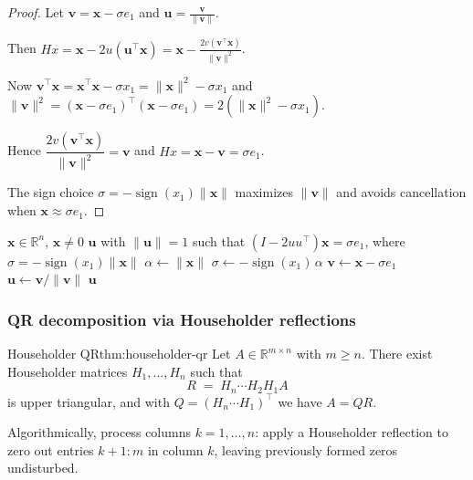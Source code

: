 \documentclass[../../main.tex]{subfiles}
\begin{document}
\begin{proof}
    Let $\mathbf{v}=\mathbf{x}-\sigma e_1$ and $\mathbf{u}=\frac{\mathbf{v}}{\|\mathbf{v}\|}$.

    Then $Hx=\mathbf{x}-2u(\mathbf{u}^\top \mathbf{x}) = \mathbf{x} - \frac{2v(\mathbf{v}^\top \mathbf{x})}{\|\mathbf{v}\|^2}$.

    Now $\mathbf{v}^\top \mathbf{x} = \mathbf{x}^\top \mathbf{x} - \sigma x_1 = \|\mathbf{x}\|^2 - \sigma x_1$ and $\|\mathbf{v}\|^2 = (\mathbf{x}-\sigma e_1)^\top(\mathbf{x}-\sigma e_1)=2(\|\mathbf{x}\|^2-\sigma x_1)$.

    Hence $\dfrac{2v(\mathbf{v}^\top \mathbf{x})}{\|\mathbf{v}\|^2}=\mathbf{v}$ and $Hx=\mathbf{x}-\mathbf{v}=\sigma e_1$.

    The sign choice $\sigma=-\operatorname{sign}(x_1)\|\mathbf{x}\|$ maximizes $\|\mathbf{v}\|$ and avoids cancellation when $\mathbf{x}\approx \sigma e_1$.
\end{proof}


\begin{algorithm}[H]
    \caption{Householder vector (stable sign)}
    \begin{algorithmic}[1]
        \Require $\mathbf{x}\in\mathbb{R}^n$, $\mathbf{x}\neq 0$
        \Ensure $\mathbf{u}$ with $\|\mathbf{u}\|=1$ such that $(I-2uu^\top)\mathbf{x}=\sigma e_1$, where $\sigma=-\operatorname{sign}(x_1)\|\mathbf{x}\|$
        \State $\alpha \gets \|\mathbf{x}\|$
        \State $\sigma \gets -\operatorname{sign}(x_1)\,\alpha$ 
        \State $\mathbf{v} \gets \mathbf{x}-\sigma e_1$
        \State $\mathbf{u} \gets \mathbf{v}/\|\mathbf{v}\|$
        \State \Return $\mathbf{u}$
    \end{algorithmic}
\end{algorithm}

\subsubsection{QR decomposition via Householder reflections}

\begin{theorem}{Householder QR}{thm:householder-qr}
    Let $A\in\mathbb{R}^{m\times n}$ with $m\ge n$. There exist Householder matrices $H_1,\dots,H_n$ such that
    \[
        R \;=\; H_n\cdots H_2 H_1 A
    \]
    is upper triangular, and with $Q=(H_n\cdots H_1)^\top$ we have $A=QR$.
\end{theorem}

Algorithmically, process columns $k=1,\dots,n$: apply a Householder reflection to zero out entries $k+1{:}m$ in column $k$, leaving previously formed zeros undisturbed.
\end{document}
